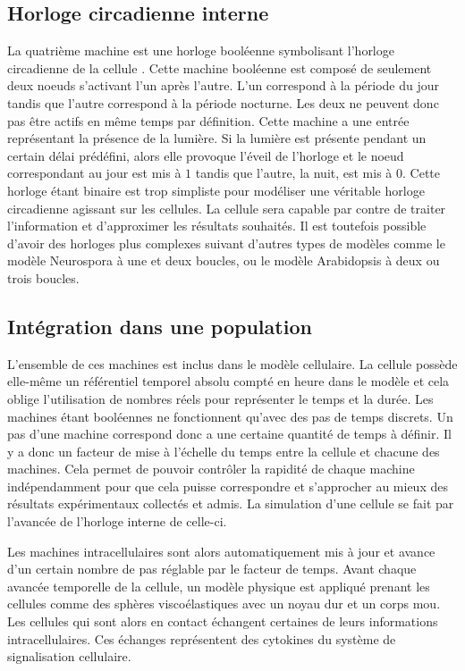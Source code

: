 \documentclass[11pt, a4paper]{article}
\begin{document}
\subsection{Horloge circadienne interne} \label{intro_clock}
La quatrième machine est une horloge booléenne symbolisant l'horloge
circadienne de la cellule \cite{akman2012}. Cette machine booléenne est composé
de seulement deux noeuds s'activant l'un après l'autre. L'un correspond à la
période du jour tandis que l'autre correspond à la période nocturne. Les deux
ne peuvent donc pas être actifs en même temps par définition. Cette machine a
une entrée représentant la présence de la lumière. Si la lumière est présente
pendant un certain délai prédéfini, alors elle provoque l'éveil de l'horloge et
le noeud correspondant au jour est mis à $1$ tandis que l'autre, la nuit, est
mis à $0$. Cette horloge étant binaire est trop simpliste pour modéliser une
véritable horloge circadienne agissant sur les cellules.
La cellule sera capable par contre de traiter l'information et d'approximer les
résultats souhaités. Il est toutefois possible d'avoir des horloges plus
complexes suivant d'autres types de modèles comme le modèle Neurospora à une et
deux boucles\cite{akman2008, leloup1999}, ou le modèle Arabidopsis à deux ou
trois boucles\cite{locke2005, locke2006}.

\subsection{Intégration dans une population}
L'ensemble de ces machines est inclus dans le modèle cellulaire. La cellule
possède elle-même un référentiel temporel absolu compté en heure dans le modèle
et cela oblige l'utilisation de nombres réels pour représenter le temps et la
durée. Les machines étant booléennes ne fonctionnent qu'avec des pas de temps
discrets. Un pas d'une machine correspond donc a une certaine quantité de temps
à définir. Il y a donc un facteur de mise à l'échelle du temps entre la cellule
et chacune des machines. Cela permet de pouvoir contrôler la rapidité de chaque
machine indépendamment pour que cela puisse correspondre et s'approcher au
mieux des résultats expérimentaux collectés et admis. La simulation d'une
cellule se fait par l'avancée de l'horloge interne de celle-ci.

Les machines intracellulaires sont alors automatiquement mis à jour et avance
d'un certain nombre de pas réglable par le facteur de temps. Avant chaque
avancée temporelle de la cellule, un modèle physique est appliqué prenant les
cellules comme des sphères viscoélastiques avec un noyau dur et un corps mou.
Les cellules qui sont alors en contact échangent certaines de leurs
informations intracellulaires. Ces échanges représentent des cytokines du
système de signalisation cellulaire.
\end{document}
